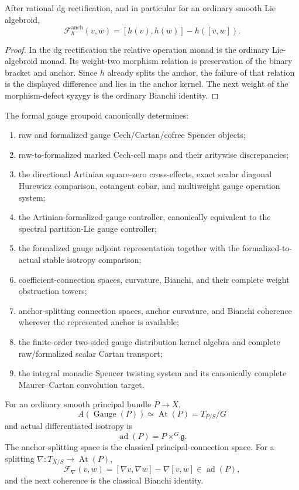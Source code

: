 \begin{proposition}
\label{prop:as-anchor-curvature-classical-form}
After rational dg rectification, and in particular for an ordinary smooth
Lie algebroid,
\[
\boxed{
    \mathcal F_h^{\mathrm{anch}}(v,w)
    =
    [h(v),h(w)]-h([v,w]).
}
\]
\end{proposition}

\begin{proof}
In the dg rectification the relative operation monad is the ordinary
Lie-algebroid monad.  Its weight-two morphism relation is preservation of the
binary bracket and anchor.  Since $h$ already splits the anchor, the failure
of that relation is the displayed difference and lies in the anchor kernel.
The next weight of the morphism-defect syzygy is the ordinary Bianchi
identity.
\end{proof}

\begin{theorem}
\label{thm:as-gauge-package}
The formal gauge groupoid canonically determines:
\begin{enumerate}
    \item raw and formalized gauge Cech/Cartan/cofree Spencer objects;
    \item raw-to-formalized marked Cech-cell maps and their aritywise
    discrepancies;
    \item the directional Artinian square-zero cross-effects, exact scalar
    diagonal Hurewicz comparison, cotangent cobar, and multiweight gauge
    operation system;
    \item the Artinian-formalized gauge controller, canonically equivalent to
    the spectral partition-Lie gauge controller;
    \item the formalized gauge adjoint representation together with the
    formalized-to-actual stable isotropy comparison;
    \item coefficient-connection spaces, curvature, Bianchi, and their
    complete weight obstruction towers;
    \item anchor-splitting connection spaces, anchor curvature, and Bianchi
    coherence wherever the represented anchor is available;
    \item the finite-order two-sided gauge distribution kernel algebra and
    complete raw/formalized scalar Cartan transport;
    \item the integral monadic Spencer twisting system and its canonically
    complete Maurer--Cartan convolution target.
\end{enumerate}

For an ordinary smooth principal bundle $P\to X$,
\[
    A(\operatorname{Gauge}(P))
    \simeq
    \operatorname{At}(P)
    =
    T_{P/S}/G
\]
and actual differentiated isotropy is
\[
    \operatorname{ad}(P)
    =
    P\times^G\mathfrak g.
\]
The anchor-splitting space is the classical principal-connection space.  For
a splitting
$\nabla:T_{X/S}\to\operatorname{At}(P)$,
\[
\boxed{
    \mathcal F_\nabla(v,w)
    =
    [\nabla v,\nabla w]
    -
    \nabla[v,w]
    \in
    \operatorname{ad}(P),
}
\]
and the next coherence is the classical Bianchi identity.
\end{theorem}

